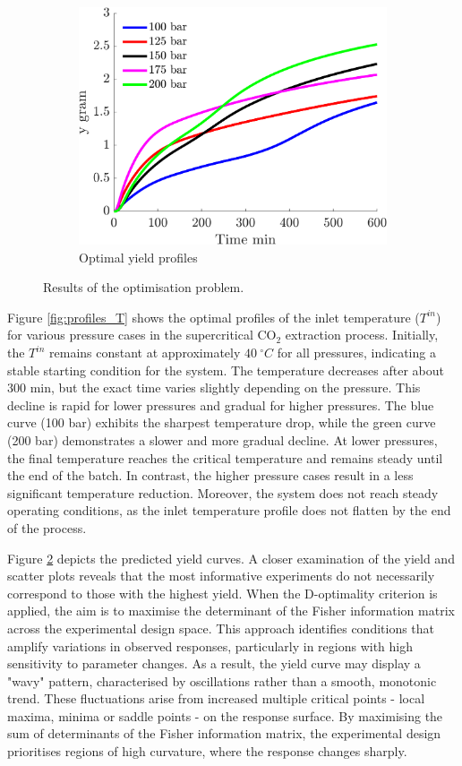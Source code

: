 \documentclass[a4paper,fleqn]{cas-dc}
\begin{document}
\begin{figure}[t!]
			\begin{subfigure}[t]{\columnwidth}
				\centering
				\includegraphics[width=0.90\columnwidth]{Figures/Results/yield.png}	
				\caption{Optimal yield profiles}
				\label{fig:profiles_y}
			\end{subfigure}
			\caption{Results of the optimisation problem.}
		\end{figure}	
		
		Figure \ref{fig:profiles_T} shows the optimal profiles of the inlet temperature ($T^{in}$) for various pressure cases in the supercritical CO$_2$ extraction process. Initially, the $T^{in}$ remains constant at approximately $40~^\circ C$ for all pressures, indicating a stable starting condition for the system. The temperature decreases after about 300 min, but the exact time varies slightly depending on the pressure. This decline is rapid for lower pressures and gradual for higher pressures. The blue curve (100 bar) exhibits the sharpest temperature drop, while the green curve (200 bar) demonstrates a slower and more gradual decline. At lower pressures, the final temperature reaches the critical temperature and remains steady until the end of the batch. In contrast, the higher pressure cases result in a less significant temperature reduction. Moreover, the system does not reach steady operating conditions, as the inlet temperature profile does not flatten by the end of the process.
		
		Figure \ref{fig:profiles_y} depicts the predicted yield curves. A closer examination of the yield and scatter plots reveals that the most informative experiments do not necessarily correspond to those with the highest yield. When the D-optimality criterion is applied, the aim is to maximise the determinant of the Fisher information matrix across the experimental design space. This approach identifies conditions that amplify variations in observed responses, particularly in regions with high sensitivity to parameter changes. As a result, the yield curve may display a "wavy" pattern, characterised by oscillations rather than a smooth, monotonic trend. These fluctuations arise from increased multiple critical points - local maxima, minima or saddle points - on the response surface. By maximising the sum of determinants of the Fisher information matrix, the experimental design prioritises regions of high curvature, where the response changes sharply. 
		
\end{document}
